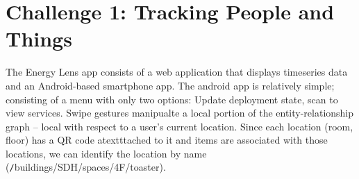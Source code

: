 




\section{Challenge 1: Tracking People and Things}
\label{sec:tracking}

The Energy Lens app consists of a web application that displays timeseries data and an Android-based smartphone
app.
The android app is relatively simple; consisting of a menu with only two options: Update deployment state, scan to view services.
Swipe gestures manipualte a local portion of the entity-relationship graph -- local with respect to a user's current location.
Since each location (room, floor) has a QR code atextttached to it and items are associated with those locations, we
can identify the location by name ({\texttt /buildings/SDH/spaces/4F/toaster}).  

